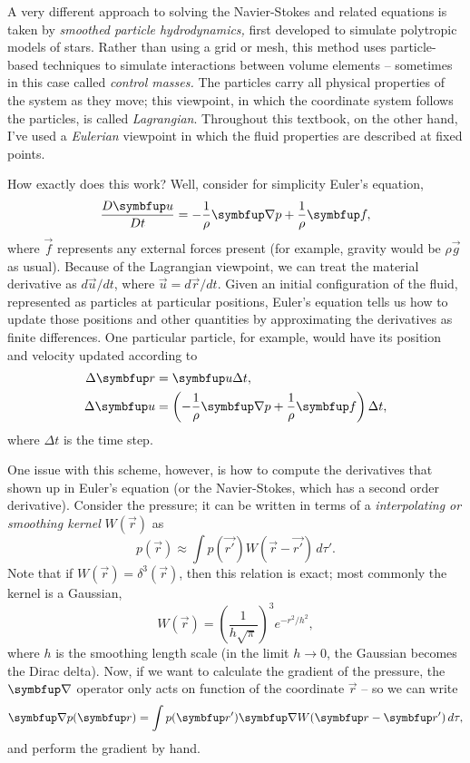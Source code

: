 A very different approach to solving the Navier-Stokes and related equations is taken by \emph{smoothed particle hydrodynamics,} first developed to simulate polytropic models of stars. Rather than using a grid or mesh, this method uses particle-based techniques to simulate interactions between volume elements -- sometimes in this case called \emph{control masses.}  The particles carry all physical properties of the system as they move; this viewpoint, in which the coordinate system follows the particles, is called \emph{Lagrangian}.  Throughout this textbook, on the other hand, I've used a \emph{Eulerian} viewpoint in which the fluid properties are described at fixed points.

How exactly does this work?  Well, consider for simplicity Euler's equation,
\[
\frac{D\vec{u}}{Dt} = -\frac{1}{\rho} \grad p + \frac{1}{\rho} \vec{f},
\]
where $\vec{f}$ represents any external forces present (for example, gravity would be $\rho \vec{g}$ as usual).  Because of the Lagrangian viewpoint, we can treat the material derivative as $d\vec{u}/dt$, where $\vec{u} = d\vec{r}/dt$.  Given an initial configuration of the fluid, represented as particles at particular positions, Euler's equation tells us how to update those positions and other quantities by approximating the derivatives as finite differences.  One particular particle, for example, would have its position and velocity updated according to
\begin{align*}
\Delta \vec{r} &= \vec{u} \Delta t, \\
\Delta \vec{u} &= \left( -\frac{1}{\rho} \grad p + \frac{1}{\rho} \vec{f} \right) \Delta t,
\end{align*}
where $\Delta t$ is the time step.

One issue with this scheme, however, is how to compute the derivatives that shown up in Euler's equation (or the Navier-Stokes, which has a second order derivative).  Consider the pressure; it can be written in terms of a \emph{interpolating or smoothing kernel} $W(\vec{r})$ as
\[
p(\vec{r}) \approx \int p(\vec{r'}) W(\vec{r} - \vec{r'}) \, d\tau'.
\]
Note that if $W(\vec{r}) = \delta^3(\vec{r})$, then this relation is exact; most commonly the kernel is a Gaussian,
\[
W(\vec{r}) = \left( \frac{1}{h \sqrt{\pi} } \right)^3 e^{-r^2/h^2},
\]
where $h$ is the smoothing length scale (in the limit $h\to 0$, the Gaussian becomes the Dirac delta).  Now, if we want to calculate the gradient of the pressure, the $\grad$ operator only acts on function of the coordinate $\vec{r}$ -- so we can write
\[
\grad p(\vec{r}) = \int p(\vec{r'}) \grad W(\vec{r} - \vec{r'}) \, d\tau,
\]
and perform the gradient by hand.  

